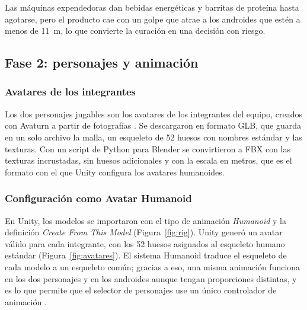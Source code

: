 Las máquinas expendedoras dan bebidas energéticas y barritas de proteína hasta agotarse, pero el
producto cae con un golpe que atrae a los androides que estén a menos de 11~m, lo que convierte la
curación en una decisión con riesgo.

\subsection{Fase 2: personajes y animación}

\subsubsection{Avatares de los integrantes}

Los dos personajes jugables son los avatares de los integrantes del equipo, creados con Avaturn a
partir de fotografías \parencite{avaturn2026}. Se descargaron en formato GLB, que guarda en un solo
archivo la malla, un esqueleto de 52 huesos con nombres estándar y las texturas. Con un script de
Python para Blender \parencite{blender2026} se convirtieron a FBX con las texturas incrustadas, sin
huesos adicionales y con la escala en metros, que es el formato con el que Unity configura los
avatares humanoides.

\subsubsection{Configuración como Avatar Humanoid}

En Unity, los modelos se importaron con el tipo de animación \textit{Humanoid} y la definición
\textit{Create From This Model} (Figura~\ref{fig:rig}). Unity generó un avatar válido para cada
integrante, con los 52 huesos asignados al esqueleto humano estándar (Figura~\ref{fig:avatares}).
El sistema Humanoid traduce el esqueleto de cada modelo a un esqueleto común; gracias a eso, una
misma animación funciona en los dos personajes y en los androides aunque tengan proporciones
distintas, y es lo que permite que el selector de personajes use un único controlador de animación
\parencite{unitymanual2026}.



